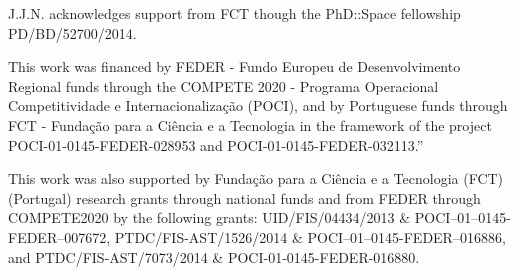 \begin{acknowledgements}

J.J.N. acknowledges support from FCT though the PhD::Space fellowship PD/BD/52700/2014.

This work was financed by FEDER - Fundo Europeu de Desenvolvimento Regional funds through the COMPETE 2020 - Programa Operacional Competitividade e Internacionalização (POCI), and by Portuguese funds through FCT - Fundação para a Ciência e a Tecnologia in the framework of the project POCI-01-0145-FEDER-028953 and POCI-01-0145-FEDER-032113.''

This work was also supported by Funda\c{c}\~ao para a Ci\^encia e a Tecnologia (FCT) (Portugal) research grants through national funds and from FEDER through COMPETE2020 by the following grants: UID/FIS/04434/2013 \& POCI--01--0145-FEDER--007672, PTDC/FIS-AST/1526/2014 \& POCI--01--0145-FEDER--016886, and PTDC/FIS-AST/7073/2014 \& POCI-01-0145-FEDER-016880.


\end{acknowledgements}

